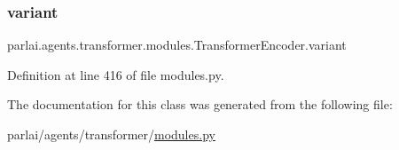 \subsubsection{\texorpdfstring{variant}{variant}}
{\footnotesize\ttfamily parlai.\+agents.\+transformer.\+modules.\+Transformer\+Encoder.\+variant}



Definition at line 416 of file modules.\+py.



The documentation for this class was generated from the following file\+:\begin{DoxyCompactItemize}
\item 
parlai/agents/transformer/\hyperlink{parlai_2agents_2transformer_2modules_8py}{modules.\+py}\end{DoxyCompactItemize}
